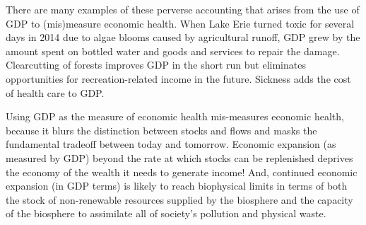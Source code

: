 There are many examples of these perverse accounting that arises from 
the use of GDP to (mis)measure economic health.
When Lake Erie turned toxic for several days in 2014 
due to algae blooms caused by agricultural runoff, 
GDP grew by the amount spent on bottled water and goods and services to repair the damage.
Clearcutting of forests improves GDP in the short run but eliminates 
opportunities for recreation-related income in the future.
Sickness adds the cost of health care to GDP.

Using GDP as the measure of economic health 
mis-measures economic health, 
because it blurs the distinction between stocks and flows
and masks the fundamental tradeoff
between today and tomorrow.
Economic expansion (as measured by GDP) 
beyond the rate at which stocks can be replenished 
deprives the economy 
of the wealth it needs to generate income!
And, continued economic expansion (in GDP terms)
is likely to reach biophysical limits in terms of both 
the stock of non-renewable resources supplied by the biosphere
and the capacity of the biosphere to assimilate 
all of society's pollution and physical waste. 









